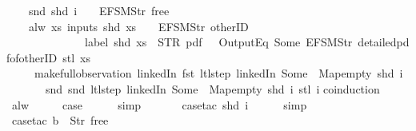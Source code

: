 \begin{isabellebody}
\ \ \ \ snd\ {\isacharparenleft}shd\ i{\isacharparenright}\ {\isacharbang}\ {}\ {\isacharequal}\ EFSM{\isachardot}Str\ {\isacharprime}{\isacharprime}free{\isacharprime}{\isacharprime}\ {\isasymLongrightarrow}\isanewline
\ \ \ \ alw\ {\isacharparenleft}{\isasymlambda}xs{\isachardot}\ inputs\ {\isacharparenleft}shd\ xs{\isacharparenright}\ {\isacharbang}\ {}\ {\isacharequal}\ EFSM{\isachardot}Str\ {\isacharprime}{\isacharprime}otherID{\isacharprime}{\isacharprime}\ {\isasymlongrightarrow}\isanewline
\ \ \ \ \ \ \ \ \ \ \ \ \ \ label\ {\isacharparenleft}shd\ xs{\isacharparenright}\ {\isacharequal}\ STR\ {\isacharprime}{\isacharprime}pdf{\isacharprime}{\isacharprime}\ {\isasymlongrightarrow}\ {\isasymnot}\ OutputEq\ {\isacharbrackleft}Some\ {\isacharparenleft}EFSM{\isachardot}Str\ {\isacharprime}{\isacharprime}detailed{\isacharunderscore}pdf{\isacharunderscore}of{\isacharunderscore}otherID{\isacharprime}{\isacharprime}{\isacharparenright}{\isacharbrackright}\ {\isacharparenleft}stl\ xs{\isacharparenright}{\isacharparenright}\isanewline
\ \ \ \ \ {\isacharparenleft}make{\isacharunderscore}full{\isacharunderscore}observation\ linkedIn\ {\isacharparenleft}fst\ {\isacharparenleft}ltl{\isacharunderscore}step\ linkedIn\ {\isacharparenleft}Some\ {}{\isacharparenright}\ Map{\isachardot}empty\ {\isacharparenleft}shd\ i{\isacharparenright}{\isacharparenright}{\isacharparenright}\isanewline
\ \ \ \ \ \ \ {\isacharparenleft}snd\ {\isacharparenleft}snd\ {\isacharparenleft}ltl{\isacharunderscore}step\ linkedIn\ {\isacharparenleft}Some\ {}{\isacharparenright}\ Map{\isachardot}empty\ {\isacharparenleft}shd\ i{\isacharparenright}{\isacharparenright}{\isacharparenright}{\isacharparenright}\ {\isacharparenleft}stl\ i{\isacharparenright}{\isacharparenright}{\isachardoublequoteclose}\isanewline
%
\isadelimproof
%
\endisadelimproof
%
\isatagproof
{}\isamarkupfalse%
{\isacharparenleft}coinduction{\isacharparenright}\isanewline
\ \ \isamarkupfalse%
\ alw\isanewline
\ \ \isamarkupfalse%
\ \isamarkupfalse%
\ {\isacharquery}case\isanewline
\ \ \ \ \isamarkupfalse%
\ simp\isanewline
\ \ \ \ \ \isamarkupfalse%
\ {\isacharparenleft}case{\isacharunderscore}tac\ {\isachardoublequoteopen}shd\ i{\isachardoublequoteclose}{\isacharparenright}\isanewline
\ \ \ \ \isamarkupfalse%
\ simp\isanewline
\ \ \ \ \isamarkupfalse%
\ {\isacharparenleft}case{\isacharunderscore}tac\ {\isachardoublequoteopen}b\ {\isacharequal}\ {\isacharbrackleft}Str\ {\isacharprime}{\isacharprime}free{\isacharprime}{\isacharprime}{\isacharbrackright}{\isachardoublequoteclose}{\isacharparenright}\isanewline

\end{isabellebody}
